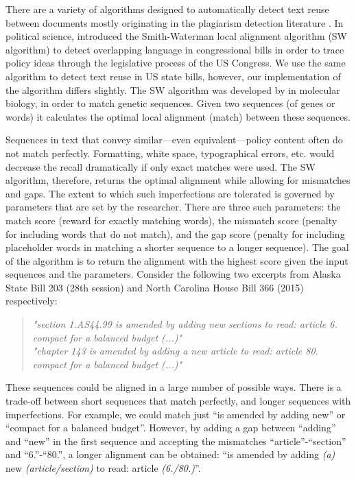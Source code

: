 \documentclass[12pt]{article} %
\begin{document}
There are a variety of algorithms designed to automatically detect text reuse
between documents mostly originating in the plagiarism detection literature
\citep[see e.g.][for an overview]{potthast2013overview}. In political science,
\citet{wilkerson2015tracing} introduced the Smith-Waterman local alignment
algorithm (SW algorithm) to detect overlapping language in congressional bills
in order to trace policy ideas through the legislative process of the US
Congress. We use the same algorithm to detect text reuse in US state bills,
however, our implementation of the algorithm differs slightly. The SW algorithm
was developed by \citet{smith1981identification} in molecular biology, in order
to match genetic sequences. Given two sequences (of genes or words) it
calculates the optimal local alignment (match) between these sequences. 

Sequences in text that convey similar---even equivalent---policy content often
do not match perfectly. Formatting, white space, typographical errors, etc.
would decrease the recall dramatically if only exact matches were used. The SW
algorithm, therefore, returns the optimal alignment while allowing for
mismatches and gaps. The extent to which such imperfections are tolerated is
governed by parameters that are set by the researcher. There are three such
parameters: the match score (reward for exactly matching words), the mismatch
score (penalty for including words that do not match), and the gap score
(penalty for including placeholder words in matching a shorter sequence to a
longer sequence). The goal of the algorithm is to return the alignment with the highest score given the input sequences and the parameters. Consider the following two excerpts from Alaska State Bill 203 (28th session) and North Carolina House Bill 366 (2015) respectively:

\begin{quote}
\textit{"section 1.AS44.99 is amended by adding new sections to read: article 6. compact for a balanced budget (...)"} \\
\textit{"chapter 143 is amended by adding a new article to read: article 80. compact for a balanced budget (...)"}
\end{quote}

These sequences could be aligned in a large number of possible ways. There is a trade-off between short sequences that match perfectly, and longer sequences with imperfections. For example, we could match just ``is amended by adding new'' or ``compact for a balanced budget''. However, by adding a gap between ``adding'' and ``new'' in the first sequence and accepting the mismatches ``article''-``section'' and ``6.''-``80.'', a longer alignment can be obtained: ``is amended by adding \textit{(a)} new \textit{(article/section)} to read: article \textit{(6./80.)}''. 
\end{document}
